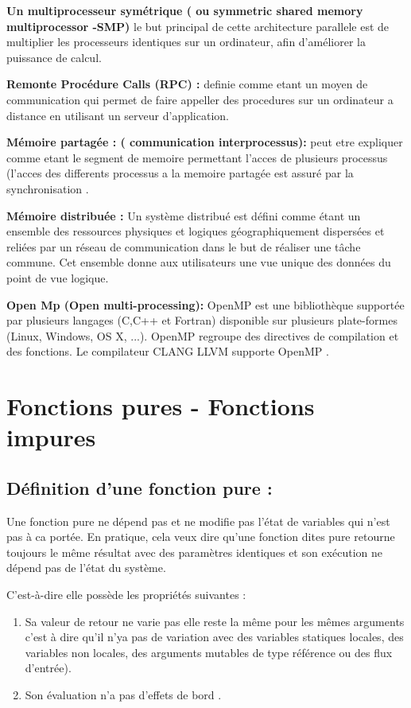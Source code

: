 \documentclass[12pt,titlepage]{article}
\begin{document}
\textbf{ Un multiprocesseur symétrique ( ou symmetric shared memory multiprocessor -SMP) } 
le but principal de cette architecture parallele  est de multiplier les processeurs identiques sur un ordinateur, afin d’améliorer  la puissance de calcul.\cite{wiki}

\textbf{ Remonte Procédure Calls (RPC) : } definie comme etant un moyen de communication qui permet de faire appeller des procedures sur un ordinateur a distance en utilisant un serveur d'application.\cite{wiki}

\textbf{ Mémoire partagée : ( communication interprocessus): }  peut etre expliquer comme etant le segment de memoire permettant l'acces de plusieurs processus (l'acces des differents processus a la memoire partagée est assuré par la synchronisation .\cite{wiki}

\textbf{ Mémoire distribuée : } Un système distribué est défini comme étant un ensemble des ressources physiques et logiques géographiquement dispersées et reliées par un réseau de communication dans le but de réaliser une tâche commune. Cet ensemble donne aux utilisateurs une vue unique des données du point de vue logique.\cite{wiki}

\textbf{ Open Mp (Open multi-processing):} OpenMP est une bibliothèque supportée par plusieurs langages (C,C++ et Fortran) disponible sur plusieurs plate-formes (Linux, Windows, OS X, ...). OpenMP regroupe des directives de compilation et des fonctions. Le compilateur CLANG LLVM supporte OpenMP .\cite{open}

\section{Fonctions pures - Fonctions impures}


\subsection{Définition d’une fonction pure :}

Une fonction pure ne dépend pas et ne modifie pas l'état de variables qui n'est pas à ca portée.
En pratique, cela veux dire qu'une fonction dites pure retourne toujours le même résultat avec des paramètres identiques et son exécution ne dépend pas de l’état du système.

C'est-à-dire elle possède  les propriétés suivantes  :

\begin{enumerate}
	\item Sa valeur de retour ne varie pas elle reste la même pour les mêmes arguments c'est à dire qu'il n'ya pas de variation avec des variables statiques locales, des variables non locales, des arguments mutables de type référence ou des flux d'entrée).

	\item Son évaluation n'a pas d'effets de bord \cite{definitionfctpure}.
\end{enumerate}
\end{document}
